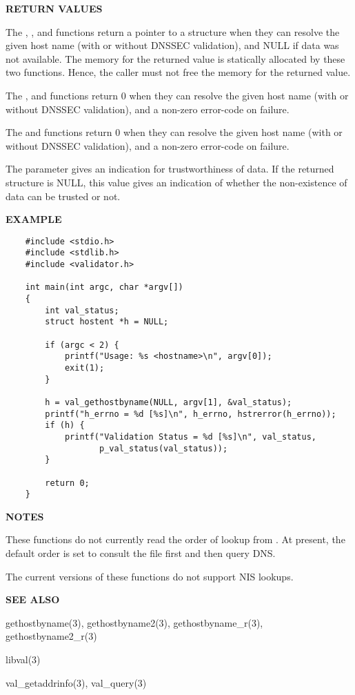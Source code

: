 {\bf RETURN VALUES}

The , , and
 functions return a pointer to a 
structure when they can resolve the given host name (with or without DNSSEC
validation), and NULL if data was not available.  The memory for the returned
value is statically allocated by these two functions.  Hence, the caller must
not free the memory for the returned value.

The ,  and
 functions return 0 when they can resolve the
given host name (with or without DNSSEC validation), and a non-zero error-code
on failure.

The  and  functions
return 0 when they can resolve the given host name (with or without DNSSEC
validation), and a non-zero error-code on failure.

The  parameter gives an indication for trustworthiness of
data. If the returned  structure is NULL, this value gives an
indication of whether the non-existence of data can be trusted or not.

{\bf EXAMPLE}

\begin{verbatim}
    #include <stdio.h>
    #include <stdlib.h>
    #include <validator.h>

    int main(int argc, char *argv[])
    {
        int val_status;
        struct hostent *h = NULL;

        if (argc < 2) {
            printf("Usage: %s <hostname>\n", argv[0]);
            exit(1);
        }

        h = val_gethostbyname(NULL, argv[1], &val_status);
        printf("h_errno = %d [%s]\n", h_errno, hstrerror(h_errno));
        if (h) {
            printf("Validation Status = %d [%s]\n", val_status,
                   p_val_status(val_status));
        }

        return 0;
    }
\end{verbatim}

{\bf NOTES}

These functions do not currently read the order of lookup from
.  At present, the default order is set to consult the 
 file first and then query DNS.

The current versions of these functions do not support NIS lookups.

{\bf SEE ALSO}

gethostbyname(3),
gethostbyname2(3), 
gethostbyname\_r(3),
gethostbyname2\_r(3)

libval(3)

val\_getaddrinfo(3),
val\_query(3) 

